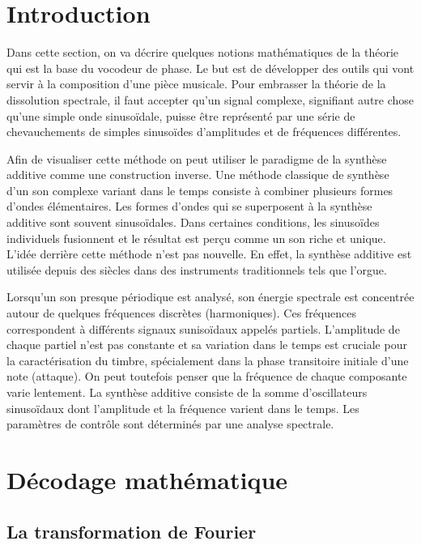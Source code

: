 
\label{ch:Contexte théorique}

\section{Introduction}

Dans cette section, on va décrire quelques notions mathématiques de la théorie qui est la base du vocodeur de phase. Le but est de développer des outils qui vont servir à la composition d'une pièce musicale. Pour embrasser la théorie de la dissolution spectrale, il faut accepter qu'un signal complexe, signifiant autre chose qu'une simple onde sinusoïdale, puisse être représenté par une série de chevauchements de simples sinusoïdes d'amplitudes et de fréquences différentes.

Afin de visualiser cette méthode on peut utiliser le paradigme de la synthèse additive comme une construction inverse. Une méthode classique de synthèse d'un son complexe variant dans le temps consiste à combiner plusieurs formes d'ondes élémentaires. Les formes d'ondes qui se superposent à la synthèse additive sont souvent sinusoïdales. Dans certaines conditions, les sinusoïdes individuels fusionnent et le résultat est perçu comme un son riche et unique. L'idée derrière cette méthode n'est pas nouvelle. En effet, la synthèse additive est utilisée depuis des siècles dans des instruments traditionnels tels que l’orgue.

Lorsqu'un son presque périodique est analysé, son énergie spectrale est concentrée autour de quelques fréquences discrètes (harmoniques). Ces fréquences correspondent à différents signaux sunisoïdaux appelés partiels. L'amplitude de chaque partiel n'est pas constante et sa variation dans le temps est cruciale pour la caractérisation du timbre, spécialement dans la phase transitoire initiale d’une note (attaque). On peut toutefois penser que la fréquence de chaque composante varie lentement. La synthèse additive consiste de la somme d'oscillateurs sinusoïdaux dont l'amplitude et la fréquence varient dans le temps. Les paramètres de contrôle sont déterminés par une analyse spectrale.

\section{Décodage mathématique}

    \subsection{La transformation de Fourier}

